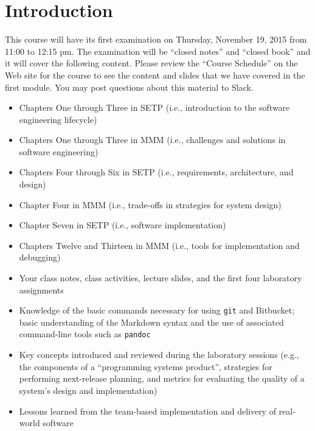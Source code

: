 


\section*{Introduction}

This course will have its first examination on Thursday, November 19, 2015 from 11:00 to 12:15 pm. The examination will
be ``closed notes'' and ``closed book'' and it will cover the following content. Please review the ``Course Schedule''
on the Web site for the course to see the content and slides that we have covered in the first module. You may post
questions about this material to Slack.

\begin{itemize}

  \itemsep 0in

  \item Chapters One through Three in SETP (i.e., introduction to the software engineering lifecycle)

  \item Chapters One through Three in MMM (i.e., challenges and solutions in software engineering)

  \item Chapters Four through Six in SETP (i.e., requirements, architecture, and design)

  \item Chapter Four in MMM (i.e., trade-offs in strategies for system design)

  \item Chapter Seven in SETP (i.e., software implementation)

  \item Chapters Twelve and Thirteen in MMM (i.e., tools for implementation and debugging)

  \item Your class notes, class activities, lecture slides, and the first four laboratory assignments

  \item Knowledge of the basic commands necessary for using {\tt git} and Bitbucket; basic understanding of the Markdown
    syntax and the use of associated command-line tools such as {\tt pandoc}

  \item Key concepts introduced and reviewed during the laboratory sessions (e.g., the components of a ``programming
    systems product'', strategies for performing next-release planning, and metrics for evaluating the quality of a
    system's design and implementation)

  \item Lessons learned from the team-based implementation and delivery of real-world software

\end{itemize}

